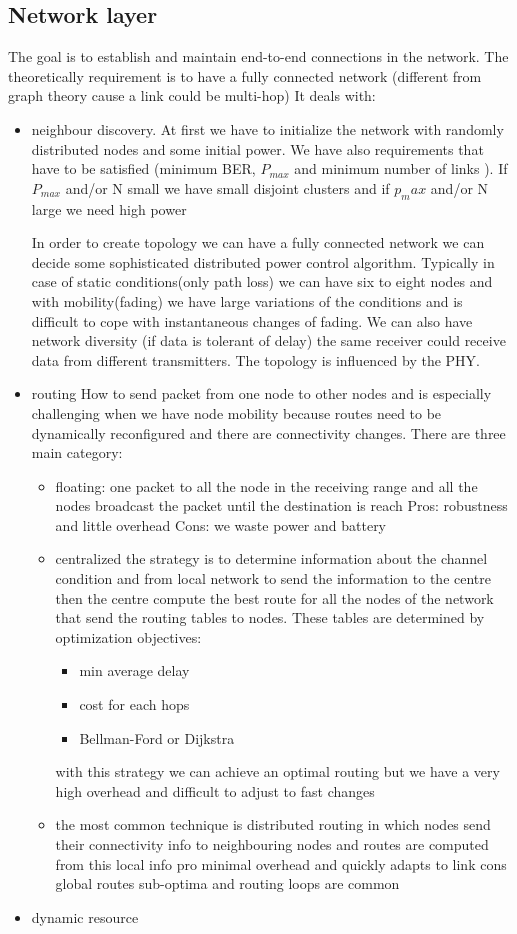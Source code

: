 \subsection{Network layer}
The goal is to establish and maintain end-to-end connections in the network. The theoretically requirement is to have a fully connected network (different from graph theory cause a link could be multi-hop)
It deals with:
\begin{itemize}
	\item neighbour discovery.
	At first we have to initialize the network with randomly distributed nodes and some initial power. We have also requirements that have to be satisfied (minimum BER, $ P_{max} $ and minimum number of links ). If $ P_{max} $ and/or N small we have small disjoint clusters and if $ p_max $ and/or N large we need high power
	
	In order to create topology we can have a fully connected network we can decide some sophisticated distributed power control algorithm. Typically in case of static conditions(only path loss) we can have six to eight nodes and with mobility(fading) we have large variations of the conditions and is difficult to cope with instantaneous changes of fading. We can also have network diversity (if data is tolerant of delay) the same receiver could receive data from different transmitters. The topology is influenced by the PHY. 
	
	\item routing 
	How to send packet from one node to other nodes and is especially challenging when we have node mobility because routes need to be dynamically reconfigured and there are connectivity changes. There are three main category:
	\begin{itemize}
		\item floating: one packet to all the node in the receiving range and all the nodes broadcast the packet until the destination is reach Pros: robustness and little overhead Cons: we waste power and battery
		\item centralized the strategy is to determine information about the channel condition and from local network to send the information to the centre then the centre compute the best route for all the nodes of the network that send the routing tables to nodes. These tables are determined by optimization objectives: 
		\begin{itemize}
			\item min average delay
			\item cost for each hops
			\item Bellman-Ford or Dijkstra
		\end{itemize}
		with this strategy we can achieve an optimal routing but we have a very high overhead and difficult to adjust to fast changes
		
		\item the most common technique is distributed routing in which nodes send their connectivity info to neighbouring nodes and routes are computed from this local info pro minimal overhead and quickly adapts to link cons global routes sub-optima and routing loops are common
	\end{itemize}
	\item dynamic resource	
\end{itemize}